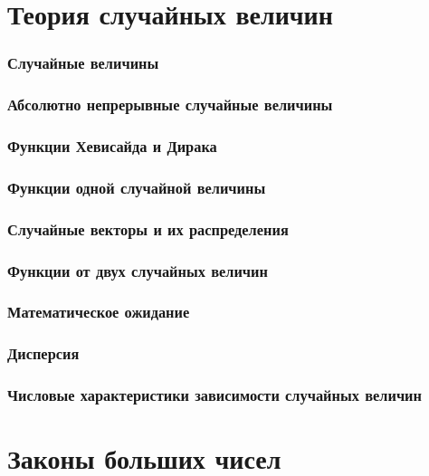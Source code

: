 \part{Теория случайных величин}

\section{Случайные величины}

\section{Абсолютно непрерывные случайные величины}

\section{Функции Хевисайда и Дирака}

\section{Функции одной случайной величины}

\section{Случайные векторы и их распределения}

\section{Функции от двух случайных величин}

\section{Математическое ожидание}

\section{Дисперсия}

\section{Числовые характеристики зависимости
случайных величин}


\part{Законы больших чисел}

